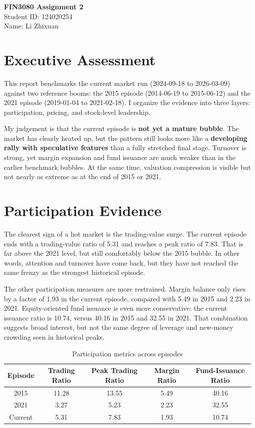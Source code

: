 \documentclass[11pt]{article}
\begin{document}
\begin{center}
\textbf{FIN3080 Assignment 2}\\
Student ID: 124020254\\
Name: Li Zhixuan
\end{center}

\section{Executive Assessment}

This report benchmarks the current market run (2024-09-18 to 2026-03-09) against two reference booms: the 2015 episode (2014-06-19 to 2015-06-12) and the 2021 episode (2019-01-04 to 2021-02-18). I organize the evidence into three layers: participation, pricing, and stock-level leadership.

My judgement is that the current episode is \textbf{not yet a mature bubble}. The market has clearly heated up, but the pattern still looks more like a \textbf{developing rally with speculative features} than a fully stretched final stage. Turnover is strong, yet margin expansion and fund issuance are much weaker than in the earlier benchmark bubbles. At the same time, valuation compression is visible but not nearly as extreme as at the end of 2015 or 2021.

\section{Participation Evidence}

The clearest sign of a hot market is the trading-value surge. The current episode ends with a trading-value ratio of 5.31 and reaches a peak ratio of 7.83. That is far above the 2021 level, but still comfortably below the 2015 bubble. In other words, attention and turnover have come back, but they have not reached the same frenzy as the strongest historical episode.

The other participation measures are more restrained. Margin balance only rises by a factor of 1.93 in the current episode, compared with 5.49 in 2015 and 2.23 in 2021. Equity-oriented fund issuance is even more conservative: the current issuance ratio is 10.74, versus 40.16 in 2015 and 32.55 in 2021. That combination suggests broad interest, but not the same degree of leverage and new-money crowding seen in historical peaks.

\begin{table}[H]
\centering
\caption{Participation metrics across episodes}
\begin{tabular}{ccccc}
\toprule
Episode & Trading Ratio & Peak Trading Ratio & Margin Ratio & Fund-Issuance Ratio \\
\midrule
2015 & 11.28 & 13.55 & 5.49 & 40.16 \\
2021 & 3.27 & 5.23 & 2.23 & 32.55 \\
Current & 5.31 & 7.83 & 1.93 & 10.74 \\
\bottomrule
\end{tabular}
\end{table}
\end{document}
